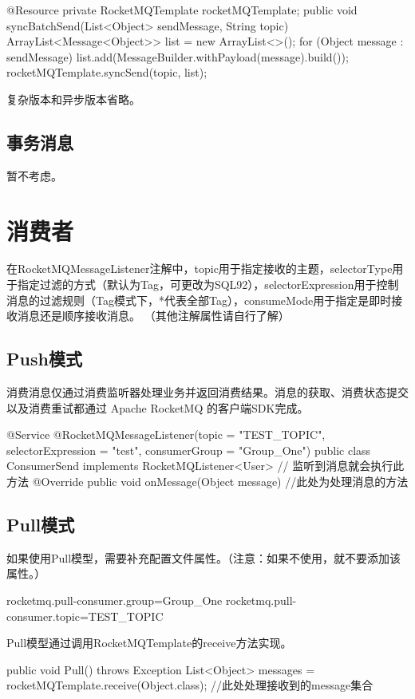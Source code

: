 \documentclass[11pt, a4paper, oneside, fontset=none]{ctexbook}
\begin{document}
\begin{java}[caption=批量消息同步发送方式（简化版）]
@Resource
private RocketMQTemplate rocketMQTemplate;
public void syncBatchSend(List<Object> sendMessage, String topic) {
  ArrayList<Message<Object>> list = new ArrayList<>();
  for (Object message : sendMessage) {
    list.add(MessageBuilder.withPayload(message).build());
  }
  rocketMQTemplate.syncSend(topic, list);
}
\end{java}

复杂版本和异步版本省略。
\subsection{事务消息}
暂不考虑。

\section{消费者}
在RocketMQMessageListener注解中，topic用于指定接收的主题，selectorType用于指定过滤的方式（默认为Tag，可更改为SQL92），selectorExpression用于控制消息的过滤规则（Tag模式下，*代表全部Tag），consumeMode用于指定是即时接收消息还是顺序接收消息。
（其他注解属性请自行了解）
\subsection{Push模式}
消费消息仅通过消费监听器处理业务并返回消费结果。消息的获取、消费状态提交以及消费重试都通过 Apache RocketMQ 的客户端SDK完成。
\begin{java}[caption=Push模式消费者]
@Service
@RocketMQMessageListener(topic = "TEST_TOPIC", selectorExpression = "test", consumerGroup = "Group_One")
public class ConsumerSend implements RocketMQListener<User> {
  // 监听到消息就会执行此方法
  @Override
  public void onMessage(Object message) {
    //此处为处理消息的方法
  }
}
\end{java}

\subsection{Pull模式}
如果使用Pull模型，需要补充配置文件属性。（注意：如果不使用，就不要添加该属性。）

\begin{yaml}[caption=lite pull consumer所需配置属性]
rocketmq.pull-consumer.group=Group_One
rocketmq.pull-consumer.topic=TEST_TOPIC
\end{yaml}

Pull模型通过调用RocketMQTemplate的receive方法实现。
\begin{java}[caption=Pull模式消费者]
public void Pull() throws Exception {
  List<Object> messages = rocketMQTemplate.receive(Object.class);
  //此处处理接收到的message集合
}
\end{java}


\end{document}
